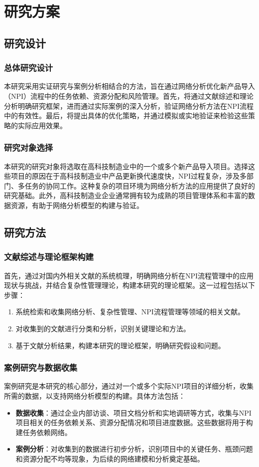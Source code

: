\chapter{研究方案}
\section{研究设计}

\subsection{总体研究设计}
本研究采用实证研究与案例分析相结合的方法，旨在通过网络分析优化新产品导入（NPI）流程中的任务依赖、资源分配和风险管理。首先，将通过文献综述和理论分析明确研究框架，进而通过实际案例的深入分析，验证网络分析方法在NPI流程中的有效性。最后，将提出具体的优化策略，并通过模拟或实地验证来检验这些策略的实际应用效果。

\subsection{研究对象选择}
本研究的研究对象将选取在高科技制造业中的一个或多个新产品导入项目。选择这些项目的原因在于高科技制造业中产品更新换代速度快，NPI过程复杂，涉及多部门、多任务的协同工作。这种复杂的项目环境为网络分析方法的应用提供了良好的研究基础。此外，高科技制造业企业通常拥有较为成熟的项目管理体系和丰富的数据资源，有助于网络分析模型的构建与验证。

\section{研究方法}

\subsection{文献综述与理论框架构建}
首先，通过对国内外相关文献的系统梳理，明确网络分析在NPI流程管理中的应用现状与挑战，并结合复杂性管理理论，构建本研究的理论框架。这一过程包括以下步骤：
\begin{enumerate}
    \item 系统检索和收集网络分析、复杂性管理、NPI流程管理等领域的相关文献。
    \item 对收集到的文献进行分类和分析，识别关键理论和方法。
    \item 基于文献分析结果，构建本研究的理论框架，明确研究假设和问题。
\end{enumerate}

\subsection{案例研究与数据收集}
案例研究是本研究的核心部分，通过对一个或多个实际NPI项目的详细分析，收集所需的数据，以支持网络分析模型的构建。具体方法包括：
\begin{itemize}
    \item \textbf{数据收集}：通过企业内部访谈、项目文档分析和实地调研等方式，收集与NPI项目相关的任务依赖关系、资源分配情况和项目进度数据。这些数据将用于构建任务依赖网络。
    \item \textbf{案例分析}：对收集到的数据进行初步分析，识别项目中的关键任务、瓶颈问题和资源分配不均等现象，为后续的网络建模和分析奠定基础。
\end{itemize}

